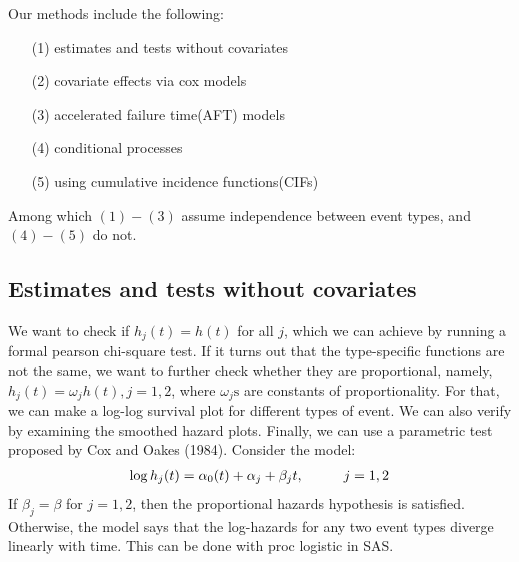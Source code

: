 \documentclass[times, doublespace]{simauth}
\begin{document}
Our methods include the following:
\begin{enumerate}
	\item[(1)] estimates and tests without covariates 
	\item[(2)] covariate effects via cox models
	\item[(3)] accelerated failure time(AFT) models
	\item[(4)]conditional processes
	\item[(5)] using cumulative incidence functions(CIFs)
\end{enumerate}

Among which $(1) - (3)$ assume independence between event types, and $(4)- (5)$ do not.

\subsection{Estimates and tests without covariates}
We want to check if $h_j(t) = h(t)$ for all $j$, which we can achieve by running a formal pearson chi-square test.  If it turns out that the type-specific functions are not the same, we want to further check whether they are proportional, namely, $h_j(t) = \omega_j h(t), j = 1, 2$, where $\omega_j\text{s}$ are constants of proportionality. For that, we can make a log-log survival plot for different types of event. We can also verify by examining the smoothed hazard plots. Finally, we can use a parametric test proposed by Cox and Oakes (1984)\cite{Cox84}. Consider the model:
\begin{align*}
	\log h_j(t) = \alpha_0(t) + \alpha_j + \beta_j t, \hskip 1cm j = 1, 2
\end{align*}
If $\beta_j = \beta$ for $j = 1, 2$, then the proportional hazards hypothesis is satisfied. Otherwise, the model says that the log-hazards for any two event types diverge linearly with time.  This can be done with proc logistic in SAS.
\end{document}
